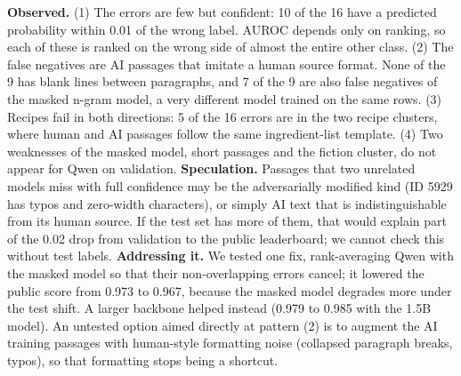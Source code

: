 \textbf{Observed.} (1) The errors are few but confident: 10 of the 16 have a predicted probability within 0.01 of the wrong label. AUROC depends only on ranking, so each of these is ranked on the wrong side of almost the entire other class. (2) The false negatives are AI passages that imitate a human source format. None of the 9 has blank lines between paragraphs, and 7 of the 9 are also false negatives of the masked n-gram model, a very different model trained on the same rows. (3) Recipes fail in both directions: 5 of the 16 errors are in the two recipe clusters, where human and AI passages follow the same ingredient-list template. (4) Two weaknesses of the masked model, short passages and the fiction cluster, do not appear for Qwen on validation.
\textbf{Speculation.} Passages that two unrelated models miss with full confidence may be the adversarially modified kind (ID 5929 has typos and zero-width characters), or simply AI text that is indistinguishable from its human source. If the test set has more of them, that would explain part of the 0.02 drop from validation to the public leaderboard; we cannot check this without test labels.
\textbf{Addressing it.} We tested one fix, rank-averaging Qwen with the masked model so that their non-overlapping errors cancel; it lowered the public score from 0.973 to 0.967, because the masked model degrades more under the test shift. A larger backbone helped instead (0.979 to 0.985 with the 1.5B model). An untested option aimed directly at pattern (2) is to augment the AI training passages with human-style formatting noise (collapsed paragraph breaks, typos), so that formatting stops being a shortcut.
